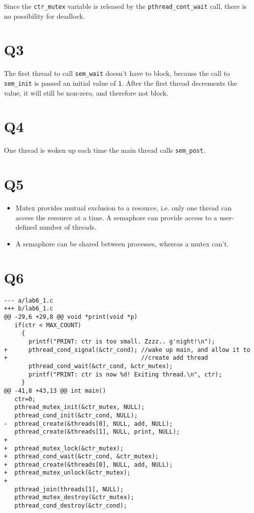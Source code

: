 \documentclass[runningheads,a4paper]{report}
\begin{document}
Since the \texttt{ctr\_mutex} variable is released by the
\texttt{pthread\_cont\_wait} call, there is no possibility for
deadlock.

\section*{Q3}

The first thread to call \texttt{sem\_wait} doesn't have to block,
because the call to \texttt{sem\_init} is passed an initial value of
\texttt{1}. After the first thread decrements the value, it
will still be non-zero, and therefore not block.

\section*{Q4}

One thread is woken up each time the main thread calls
\texttt{sem\_post}.

\section*{Q5}

\begin{itemize}
  \item Mutex provides mutual exclusion to a resource, i.e. only one
    thread can access the resource at a time. A semaphore can provide
    access to a user-defined number of threads.
  \item A semaphore can be shared between processes, whereas a mutex
    can't.
\end{itemize}

\section*{Q6}

\lstset{caption=git-diff of changes made to ensure that print executes
  before add}
\begin{lstlisting}
--- a/lab6_1.c
+++ b/lab6_1.c
@@ -29,6 +29,8 @@ void *print(void *p)
   if(ctr < MAX_COUNT)
     {
       printf("PRINT: ctr is too small. Zzzz.. g'night!\n");
+      pthread_cond_signal(&ctr_cond); //wake up main, and allow it to
+                                      //create add thread
       pthread_cond_wait(&ctr_cond, &ctr_mutex);
       printf("PRINT: ctr is now %d! Exiting thread.\n", ctr);
     }
@@ -41,8 +43,13 @@ int main()
   ctr=0;
   pthread_mutex_init(&ctr_mutex, NULL);
   pthread_cond_init(&ctr_cond, NULL);
-  pthread_create(&threads[0], NULL, add, NULL);
   pthread_create(&threads[1], NULL, print, NULL);
+
+  pthread_mutex_lock(&ctr_mutex);
+  pthread_cond_wait(&ctr_cond, &ctr_mutex);
+  pthread_create(&threads[0], NULL, add, NULL);
+  pthread_mutex_unlock(&ctr_mutex);
+
   pthread_join(threads[1], NULL);
   pthread_mutex_destroy(&ctr_mutex);
   pthread_cond_destroy(&ctr_cond);
\end{lstlisting}
\end{document}
